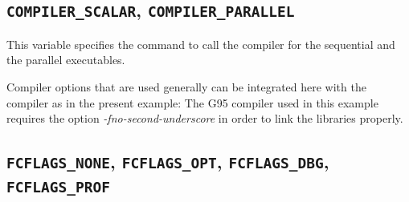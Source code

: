 \documentclass[a4paper,10pt]{report}
\newcommand{\mytt}[1]{{\tt #1}}
\begin{document}
\subsection{\mytt{COMPILER\_SCALAR},  \mytt{COMPILER\_PARALLEL}}
This variable specifies the command to call the compiler for the
sequential and the parallel executables.

Compiler options that are used generally can be integrated here with
the compiler as in the present example: The G95 compiler used in this
example requires the option \textit{-fno-second-underscore} in order
to link the libraries properly.

\subsection{\mytt{FCFLAGS\_NONE},  \mytt{FCFLAGS\_OPT}, 
\mytt{FCFLAGS\_DBG},  \mytt{FCFLAGS\_PROF}}
\end{document}
